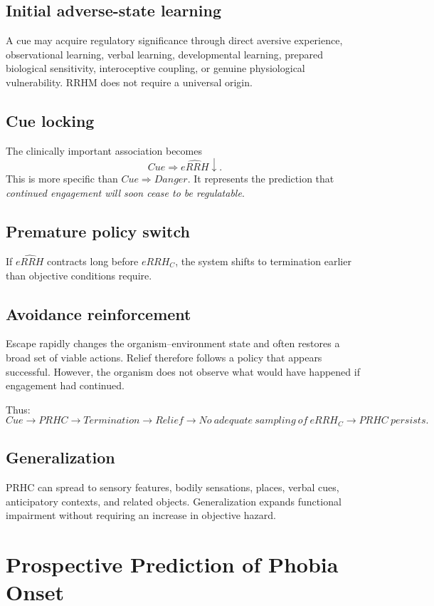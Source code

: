 \documentclass[11pt]{article}
\begin{document}
\subsection{Initial adverse-state learning}
A cue may acquire regulatory significance through direct aversive experience, observational learning, verbal learning, developmental learning, prepared biological sensitivity, interoceptive coupling, or genuine physiological vulnerability. RRHM does not require a universal origin.

\subsection{Cue locking}
The clinically important association becomes
\[
Cue\Rightarrow\widehat{eRRH}\downarrow.
\]
This is more specific than $Cue\Rightarrow Danger$. It represents the prediction that \emph{continued engagement will soon cease to be regulatable}.

\subsection{Premature policy switch}
If $\widehat{eRRH}$ contracts long before $eRRH_C$, the system shifts to termination earlier than objective conditions require.

\subsection{Avoidance reinforcement}
Escape rapidly changes the organism--environment state and often restores a broad set of viable actions. Relief therefore follows a policy that appears successful. However, the organism does not observe what would have happened if engagement had continued.

Thus:
\[
Cue\rightarrow PRHC\rightarrow Termination\rightarrow Relief\rightarrow No\ adequate\ sampling\ of\ eRRH_C\rightarrow PRHC\ persists.
\]

\subsection{Generalization}
PRHC can spread to sensory features, bodily sensations, places, verbal cues, anticipatory contexts, and related objects. Generalization expands functional impairment without requiring an increase in objective hazard.

\section{Prospective Prediction of Phobia Onset}
\end{document}
